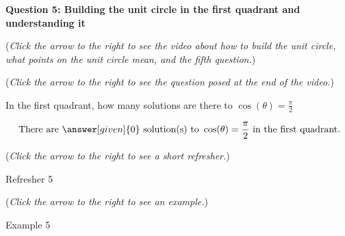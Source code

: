 \documentclass{ximera}
\begin{document}
\textbf{Question 5: Building the unit circle in the first quadrant and understanding it}
\begin{question}
\begin{flushright}
{\color{blue}(\emph{Click the arrow to the right to see
the
video about how to build the unit circle, what points
on the
unit circle mean, and the fifth question.})}
\end{flushright}
\begin{center}
\begin{expandable}
\begin{flushright}
{\color{blue}(\emph{Click the arrow to the right to see the question
posed at the end of the video.})}
\end{flushright}
\begin{expandable}
In the first quadrant, how many solutions are there to $\cos(\theta) = \frac{\pi}{2}$
\begin{prompt}
\[
\text{ There are }\answer[given]{0}\text{ solution(s)
to }\cos(\theta)=\frac{\pi}{2}\text{ in the first quadrant.}
\]
\end{prompt}
\begin{flushright}
{\color{blue}(\emph{Click the arrow to the right to see a short refresher.})}
\end{flushright}
\begin{expandable}
\begin{center}
Refresher 5
\end{center}
\end{expandable}
\begin{flushright}
{\color{blue}(\emph{Click the arrow to the right to see an example.})}
\end{flushright}
\begin{expandable}
\begin{center}
Example 5
\end{center}
\end{expandable}
\end{expandable}
\end{expandable}
\end{center}
\end{question}
\end{document}
